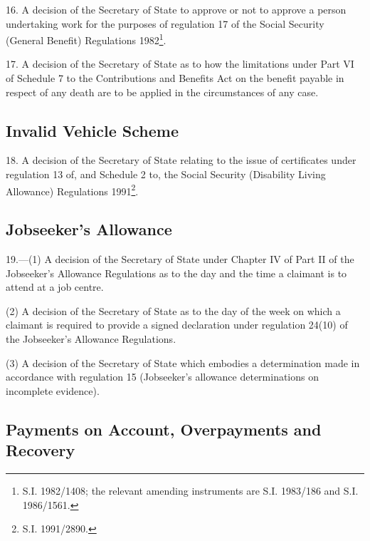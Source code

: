 \documentclass[12pt,a4paper]{article}
\begin{document}
\medskip

16.  A decision of the Secretary of State to approve or not to approve a person undertaking work for the purposes of regulation 17 of the Social Security (General Benefit) Regulations 1982\footnote{\frenchspacing S.I. 1982/1408; the relevant amending instruments are S.I. 1983/186 and S.I. 1986/1561.}.

\medskip

17.  A decision of the Secretary of State as to how the limitations under Part VI of Schedule 7 to the Contributions and Benefits Act on the benefit payable in respect of any death are to be applied in the circumstances of any case.

\subsection*{Invalid Vehicle Scheme}

18.  A decision of the Secretary of State relating to the issue of certificates under regulation 13 of, and Schedule 2 to, the Social Security (Disability Living Allowance) Regulations 1991\footnote{\frenchspacing S.I. 1991/2890.}.

\subsection*{Jobseeker’s Allowance}

19.—(1) A decision of the Secretary of State under Chapter IV of Part II of the Jobseeker’s Allowance Regulations as to the day and the time a claimant is to attend at a job centre.

(2) A decision of the Secretary of State as to the day of the week on which a claimant is required to provide a signed declaration under regulation 24(10) of the Jobseeker’s Allowance Regulations.

(3) A decision of the Secretary of State which embodies a determination made in accordance with regulation 15 (Jobseeker’s allowance determinations on incomplete evidence).

\subsection*{Payments on Account, Overpayments and Recovery}
\end{document}
